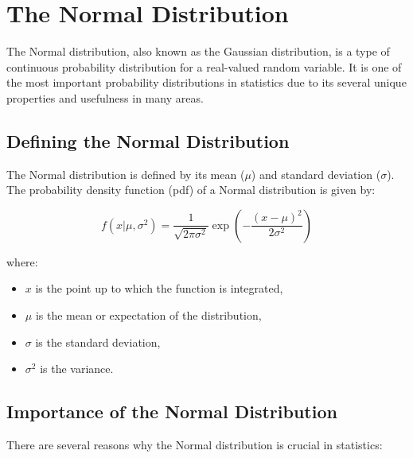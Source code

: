 \chapter{The Normal Distribution}


The Normal distribution, also known as the Gaussian distribution, is a type of continuous probability distribution for a real-valued random variable. It is one of the most important probability distributions in statistics due to its several unique properties and usefulness in many areas.

\section{Defining the Normal Distribution}
The Normal distribution is defined by its mean ($\mu$) and standard deviation ($\sigma$). The probability density function (pdf) of a Normal distribution is given by:

\begin{equation*}
f(x|\mu, \sigma^2) = \frac{1}{\sqrt{2\pi\sigma^2}} \exp\left(-\frac{(x-\mu)^2}{2\sigma^2}\right)
\end{equation*}

where:
\begin{itemize}
\item $x$ is the point up to which the function is integrated,
\item $\mu$ is the mean or expectation of the distribution,
\item $\sigma$ is the standard deviation,
\item $\sigma^2$ is the variance.
\end{itemize}

\section{Importance of the Normal Distribution}
There are several reasons why the Normal distribution is crucial in statistics:

